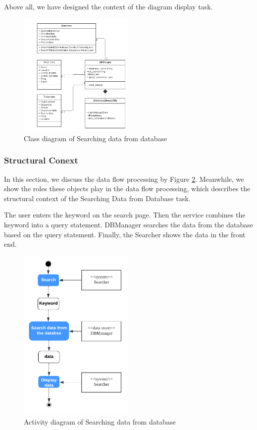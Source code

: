 \documentclass[conference]{IEEEtran}
\begin{document}
Above all, we have designed the context of the diagram display task.
\begin{figure}[htbp]
	\centerline{\includegraphics[width=0.5\textwidth]{image/searching hotel class1.pdf}}
	\caption{Class diagram of Searching data from database }
	\label{class1}
\end{figure}

\subsubsection{\textbf{Structural Conext }}

\textbf{}

In this section, we discuss the data flow processing by Figure \ref{activity1}. Meanwhile, we show the roles these objects play in the data flow processing, which describes the structural context of the Searching Data from Database task.

The user enters the keyword on the search page. Then the service combines the keyword into a query statement. DBManager searches the data from the database based on the query statement. Finally, the Searcher shows the data in the front end.
\begin{figure}[htbp]
	\centerline{\includegraphics[width=0.5\textwidth]{image/searching hotel activity1.pdf}}
	\caption{Activity diagram of Searching data from database }
	\label{activity1}
\end{figure}
\end{document}

